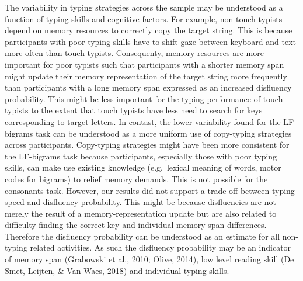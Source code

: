 \documentclass[
  english,
  man,mask,floatsintext]{apa7}
\begin{document}
The variability in typing strategies across the sample may be understood as a function of typing skills and cognitive factors. For example, non-touch typists depend on memory resources to correctly copy the target string. This is because participants with poor typing skills have to shift gaze between keyboard and text more often than touch typists. Consequenty, memory resources are more important for poor typists such that participants with a shorter memory span might update their memory representation of the target string more frequently than participants with a long memory span expressed as an increased disfluency probability. This might be less important for the typing performance of touch typists to the extent that touch typists have less need to search for keys corresponding to target letters. In contast, the lower variability found for the LF-bigrams task can be understood as a more uniform use of copy-typing strategies across participants. Copy-typing strategies might have been more consistent for the LF-bigrams task because participants, especially those with poor typing skills, can make use existing knowledge (e.g.~lexical meaning of words, motor codes for bigrams) to relief memory demands. This is not possible for the consonants task. However, our results did not support a trade-off between typing speed and disfluency probability. This might be because disfluencies are not merely the result of a memory-representation update but are also related to difficulty finding the correct key and individual memory-span differences. Therefore the disfluency probability can be understood as an estimate for all non-typing related activities. As such the disfluency probability may be an indicator of memory span (Grabowski et al., 2010; Olive, 2014), low level reading skill (De Smet, Leijten, \& Van Waes, 2018) and individual typing skills.
\end{document}
